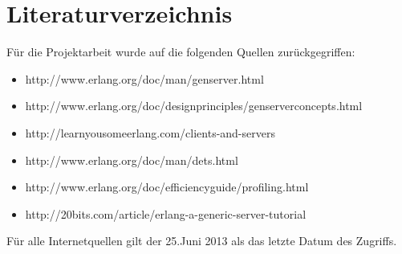 \documentclass[10pt,a4paper]{article}
\begin{document}
\section{Literaturverzeichnis}
Für die Projektarbeit wurde auf die folgenden Quellen zurückgegriffen:
\begin{itemize}
\item http://www.erlang.org/doc/man/gen\textunderscore server.html 
\item http://www.erlang.org/doc/design\textunderscore principles/gen\textunderscore server\textunderscore concepts.html 
\item http://learnyousomeerlang.com/clients-and-servers  
\item http://www.erlang.org/doc/man/dets.html 
\item http://www.erlang.org/doc/efficiency\textunderscore guide/profiling.html 
\item http://20bits.com/article/erlang-a-generic-server-tutorial
\end{itemize}
Für alle Internetquellen gilt der 25.Juni 2013 als das letzte Datum des Zugriffs. 
%
\end{document}
